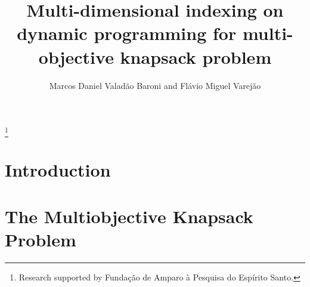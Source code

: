 \documentclass{itor}
\begin{document}
\title{ Multi-dimensional indexing on dynamic programming for multi-objective knapsack problem }

\author[M. D. V. Baroni and F. M. Varej\~ao]{Marcos Daniel Valad\~ao Baroni and Fl\'avio Miguel Varej\~ao}


\thanks{\affmark{$\ast$}Research supported by Funda\c c\~ao de Amparo \`a Pesquisa do Esp\'irito Santo.}






\begin{abstract}

\end{abstract}

\maketitle

\section{Introduction}
\label{sec:intro}


\section{The Multiobjective Knapsack Problem}
\label{sec:mokp}

\end{document}
